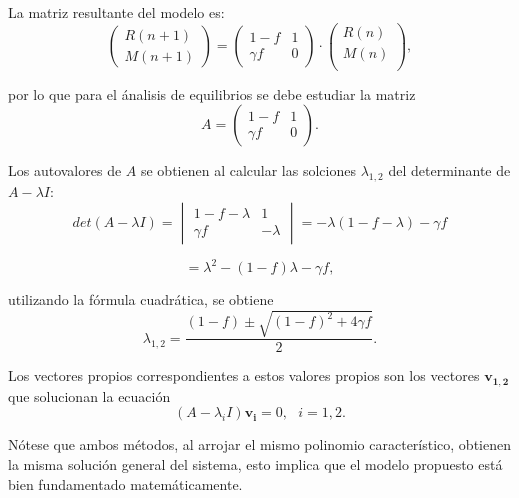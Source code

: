 La matriz resultante del modelo es:
$$\begin{pmatrix}
    R(n+1) \\
    M(n+1) 
    \end{pmatrix}=
    \begin{pmatrix}
    1-f & 1\\
    \gamma f & 0 
    \end{pmatrix} \cdot 
    \begin{pmatrix}
    R(n) \\
    M(n) \\
    \end{pmatrix},$$

por lo que para el ánalisis de equilibrios se debe estudiar la matriz
$$A=\begin{pmatrix}
    1-f & 1\\
    \gamma f & 0 
    \end{pmatrix}.$$

Los autovalores de $A$ se obtienen al calcular las solciones $\lambda_{1,2}$ del determinante de $A-\lambda I$:
$$det(A-\lambda I) = \begin{vmatrix}
    1-f-\lambda & 1\\
    \gamma f & -\lambda 
    \end{vmatrix} = -\lambda(1-f-\lambda)-\gamma f$$

$$=\lambda^2-(1-f)\lambda-\gamma f,$$

utilizando la fórmula cuadrática, se obtiene
$$\lambda_{1,2}=\dfrac{(1-f)\pm\sqrt{(1-f)^2+4\gamma f}}{2}.$$

Los vectores propios correspondientes a estos valores propios son los vectores $\mathbf{v_{1,2}}$ que solucionan la ecuación
$$(A-\lambda_i I)\mathbf{v_i}=0, \:\:\: i=1,2.$$

Nótese que ambos métodos, al arrojar el mismo polinomio característico, obtienen la misma solución general del sistema, esto implica que el modelo propuesto está bien fundamentado matemáticamente.


